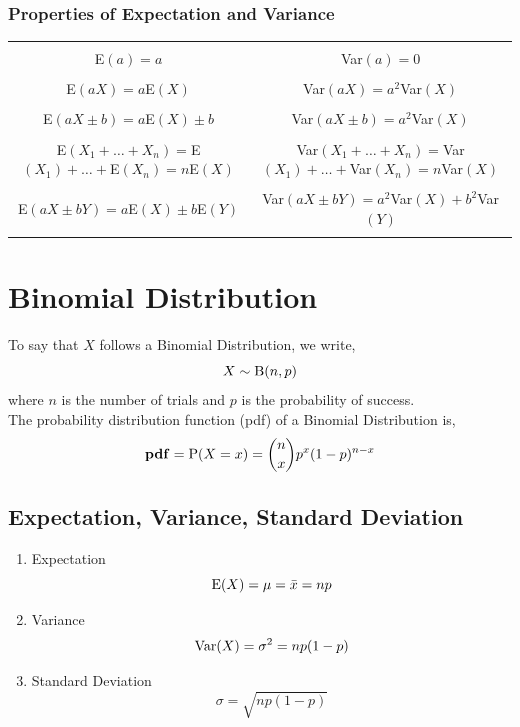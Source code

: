 \documentclass[../setup.tex]{subfiles}
\begin{document}
\subsubsection{Properties of Expectation and Variance}
\begin{tabular}{| c | c |}
\hline
& \\
E$(a)=a$ & Var$(a)=0$  \\
& \\
E$(aX)=a$E$(X)$ & Var$(aX)=a^2$Var$(X)$ \\
& \\
E$(aX\pm b)=a$E$(X) \pm b$ & Var$(aX \pm b)=a^2$Var$(X)$ \\
& \\
E$(X_1 + \dots + X_n)=$E$(X_1)+\dots + $E$(X_n)=n$E$(X)$ & Var$(X_1 + \dots + X_n)=$Var$(X_1)+\dots + $Var$(X_n)=n$Var$(X)$ \\
& \\
E$(aX\pm bY)=a$E$(X) \pm b$E$(Y)$ & Var$(aX \pm bY)=a^2$Var$(X) + b^2$Var$(Y)$ \\
& \\
\hline
\end{tabular}

\section{Binomial Distribution}
\begin{theorem}
To say that $X$ follows a Binomial Distribution, we write,
\[ X \sim \textup{B}(n, p) \] 
where $n$ is the number of trials and $p$ is the probability of success. \\
The probability distribution function (pdf) of a Binomial Distribution is,
\[ \text{\textbf{pdf}} = \textup{P}(X = x) = \binom{n}{x} p^x (1-p)^{n-x} \]
\end{theorem}

\subsection{Expectation, Variance, Standard Deviation}
\begin{enumerate}
	\item Expectation \[ \textup{E}(X) = \mu = \bar{x} = np \]
	\item Variance \[ \textup{Var}(X) = \sigma^2 = np(1-p) \]
	\item Standard Deviation \[ \sigma = \sqrt{np(1-p)} \]
\end{enumerate}
\end{document}
